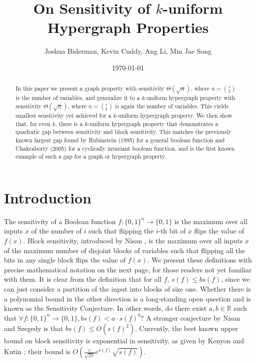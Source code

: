 \documentclass[psamsfonts]{amsart}
\theoremstyle{definition}
\theoremstyle{remark}
\numberwithin{equation}{section}
\begin{document}
	\title{On Sensitivity of $k$-uniform Hypergraph Properties}

	\author{Joshua Biderman, Kevin Cuddy, Ang Li, Min Jae Song}
	\date{\today}
	\begin{abstract}
		 In this paper we present a graph property with sensitivity $\Theta(\sqrt{n})$, where $n={v\choose2}$ is the number of variables, and generalize it to a $k$-uniform hypergraph property with sensitivity $\Theta(\sqrt{n})$, where $n={v\choose k}$ is again the number of variables. This yields smallest sensitivity yet achieved for a $k$-uniform hypergraph property. We then show that, for even $k$, there is a $k$-uniform hypergraph property that demonstrates a quadratic gap between sensitivity and block sensitivity. This matches the previously known largest gap found by Rubinstein (1995) for a general boolean function and Chakraborty (2005) for a cyclically invariant boolean function, and is the first known example of such a gap for a graph or hypergraph property.
	\end{abstract}
	\maketitle
	
	\tableofcontents
	
	\section{Introduction}
The sensitivity of a Boolean function $f: \{0,1\}^{n} \rightarrow \{0,1\}$ is the maximum over all inputs $x$ of the number of $i$ such that flipping the $i$-th bit of $x$ flips the value of $f(x)$. Block sensitivity, introduced by Nisan \cite{N}, is the maximum over all inputs $x$ of the maximum number of disjoint blocks of variables such that flipping all the bits in any single block flips the value of $f(x)$. We present these definitions with precise mathematical notation on the next page, for those readers not yet familiar with them.  It is clear from the definition that for all $f$, $s(f) \leq bs(f)$, since we can just consider a partition of the input into blocks of size one.  Whether there is a polynomial bound in the other direction is a long-standing open question and is known as the Sensitivity Conjecture. In other words, do there exist $a,b\in\mathbb{R}$ such that $\forall f:\{0,1\}^n\to\{0,1\},  bs(f)<a\cdot s(f)^b$? A stronger conjecture by Nisan and Szegedy \cite{NS} is that $bs(f) \leq O(s(f)^{2})$. Currently, the best known upper bound on block sensitivity is exponential in sensitivity, as given by Kenyon and Kutin \cite{KK}; their bound is $O(\frac{e}{\sqrt{2\pi}}e^{s(f)}\sqrt{s(f)})$.
\end{document}
